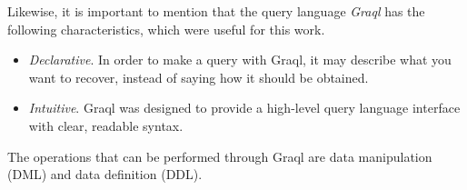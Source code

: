 Likewise, it is important to mention that the query language \textit{Graql} 
has the following characteristics, which were useful for this work.

\begin{itemize}
    \item \textit{Declarative}. In order to make a query with Graql, it may 
        describe what you want to recover, instead of saying how it should be 
        obtained.
    \item \textit{Intuitive}. Graql was designed to provide a high-level 
        query language interface with clear, readable syntax.
\end{itemize}

The operations that can be performed through Graql are data manipulation (DML) 
and data definition (DDL).

